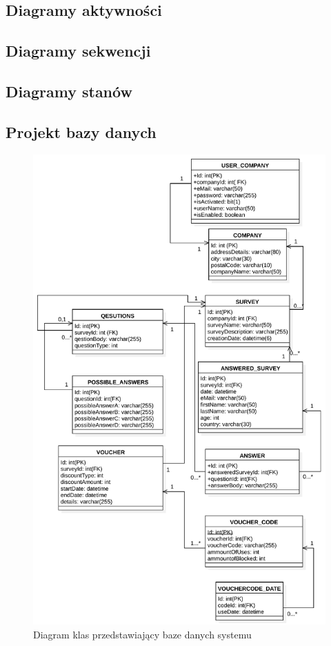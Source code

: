 \documentclass[a4paper]{article}
\begin{document}
\subsection{Diagramy aktywności}
\subsection{Diagramy sekwencji}
\subsection{Diagramy stanów}
\pagebreak
\subsection{Projekt bazy danych}
\begin{figure}[H]
  \centering
  \includegraphics[scale=0.6]{db_diagram.pdf}
  \caption{Diagram klas przedstawiający baze danych systemu}
\end{figure}
\end{document}
